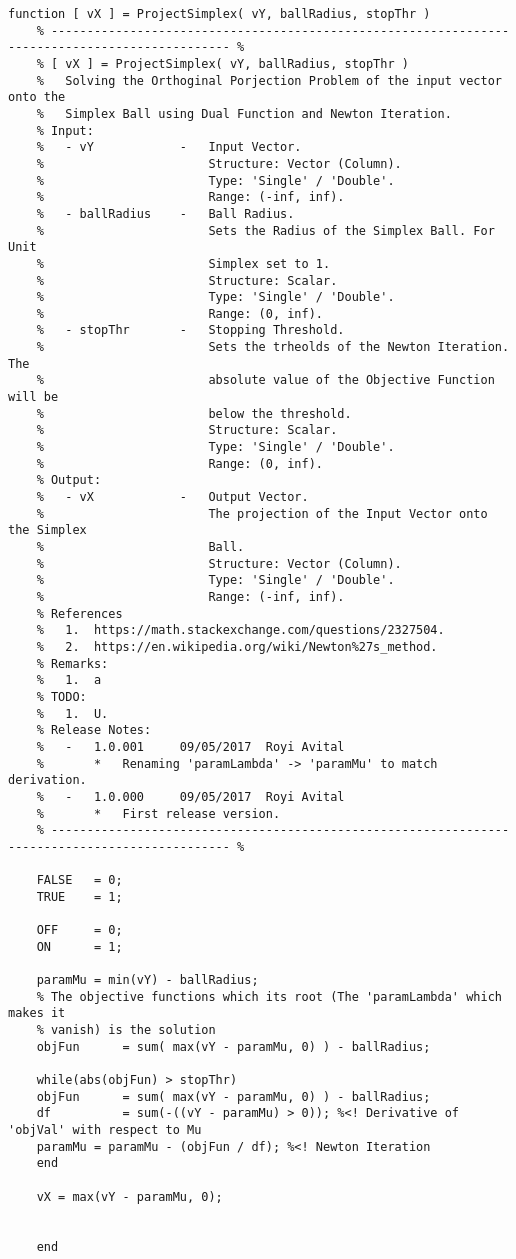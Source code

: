 \documentclass[]{article}
\begin{document}
	\begin{lstlisting}[caption={MATLAB Code - Simplex Projection}, label={lst:codeSimplexProjection}]
	function [ vX ] = ProjectSimplex( vY, ballRadius, stopThr )
	% ----------------------------------------------------------------------------------------------- %
	% [ vX ] = ProjectSimplex( vY, ballRadius, stopThr )
	%   Solving the Orthoginal Porjection Problem of the input vector onto the
	%   Simplex Ball using Dual Function and Newton Iteration.
	% Input:
	%   - vY            -   Input Vector.
	%                       Structure: Vector (Column).
	%                       Type: 'Single' / 'Double'.
	%                       Range: (-inf, inf).
	%   - ballRadius    -   Ball Radius.
	%                       Sets the Radius of the Simplex Ball. For Unit
	%                       Simplex set to 1.
	%                       Structure: Scalar.
	%                       Type: 'Single' / 'Double'.
	%                       Range: (0, inf).
	%   - stopThr       -   Stopping Threshold.
	%                       Sets the trheolds of the Newton Iteration. The
	%                       absolute value of the Objective Function will be
	%                       below the threshold.
	%                       Structure: Scalar.
	%                       Type: 'Single' / 'Double'.
	%                       Range: (0, inf).
	% Output:
	%   - vX            -   Output Vector.
	%                       The projection of the Input Vector onto the Simplex
	%                       Ball.
	%                       Structure: Vector (Column).
	%                       Type: 'Single' / 'Double'.
	%                       Range: (-inf, inf).
	% References
	%   1.  https://math.stackexchange.com/questions/2327504.
	%   2.  https://en.wikipedia.org/wiki/Newton%27s_method.
	% Remarks:
	%   1.  a
	% TODO:
	%   1.  U.
	% Release Notes:
	%   -   1.0.001     09/05/2017  Royi Avital
	%       *   Renaming 'paramLambda' -> 'paramMu' to match derivation.
	%   -   1.0.000     09/05/2017  Royi Avital
	%       *   First release version.
	% ----------------------------------------------------------------------------------------------- %
	
	FALSE   = 0;
	TRUE    = 1;
	
	OFF     = 0;
	ON      = 1;
	
	paramMu = min(vY) - ballRadius;
	% The objective functions which its root (The 'paramLambda' which makes it
	% vanish) is the solution
	objFun      = sum( max(vY - paramMu, 0) ) - ballRadius;
	
	while(abs(objFun) > stopThr)
	objFun      = sum( max(vY - paramMu, 0) ) - ballRadius;
	df          = sum(-((vY - paramMu) > 0)); %<! Derivative of 'objVal' with respect to Mu
	paramMu = paramMu - (objFun / df); %<! Newton Iteration
	end
	
	vX = max(vY - paramMu, 0);
	
	
	end
	
	\end{lstlisting}
	
	
\end{document}
